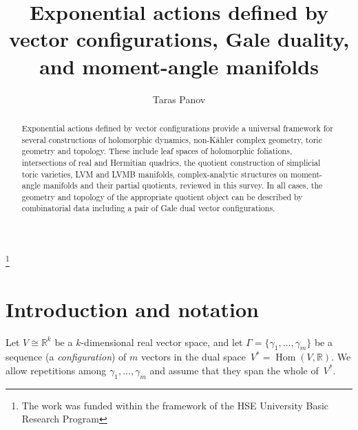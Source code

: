 \documentclass[a4paper]{amsart}
\theoremstyle{definition}
\theoremstyle{remark}
\numberwithin{equation}{section}
\def\R{\mathbb R}
\def\R{\mathbb R}
\def\Hom{\mathop{\mathrm{Hom}}}
\newcommand{\<}{\langle}
\renewcommand{\>}{\rangle}
\begin{document}
\title[Exponential actions defined by vector configurations]{Exponential actions defined by vector configurations, Gale duality, and moment-angle manifolds}

\author{Taras Panov}
\address{Faculty of Mathematics and Mechanics, Lomonosov Moscow
State University, Leninskie gory, 119991 Moscow, Russia;\newline
Institute for Information Transmission Problems, Russian Academy of Sciences, Moscow;\newline
National Research University Higher School of Economics, Moscow}
\thanks{The work was funded within the framework of the HSE University Basic Research Program}


\begin{abstract}
Exponential actions defined by vector configurations provide a universal framework for several constructions of holomorphic dynamics, non-K\"ahler complex geometry, toric geometry and topology. These include leaf spaces of holomorphic foliations, intersections of real and Hermitian quadrics, the quotient construction of simplicial toric varieties, LVM and LVMB manifolds, complex-analytic structures on moment-angle manifolds and their partial quotients, reviewed in this survey. In all cases, the geometry and topology of the appropriate quotient object can be described by combinatorial data including a pair of Gale dual vector configurations.
\end{abstract}

\maketitle
\tableofcontents




\section{Introduction and notation}
Let $V\cong\R^k$ be a $k$-dimensional real vector space, and let
$\Gamma=\{\gamma_1,\ldots,\gamma_m\}$ be a sequence (a \emph{configuration}) of $m$ vectors in the dual space~$V^*=\Hom(V,\R)$. We allow repetitions among $\gamma_1,\ldots,\gamma_m$
 and assume that they span the whole of~$V^*$. 
\end{document}
